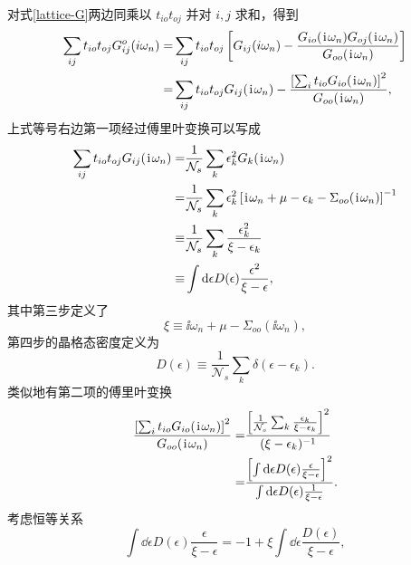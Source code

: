 对式\eqref{lattice-G}两边同乘以 $t_{io}t_{oj}$ 并对 $i,j$ 求和，得到
\begin{equation}
    \begin{aligned}
        \sum_{ij}t_{io}t_{oj}G_{ij}^o(i\omega_n)=&\sum_{ij}t_{io}t_{oj}\left[ G_{ij}(i\omega_n)-\frac{G_{io}(\hspace{0.1em}\mathrm{i}\hspace{0.1em}\omega_n)G_{oj}(\hspace{0.1em}\mathrm{i}\hspace{0.1em}\omega_n)}{G_{oo}(\hspace{0.1em}\mathrm{i}\hspace{0.1em}\omega_n)} \right]\\
        =& \sum_{ij}t_{io}t_{oj}G_{ij}(\hspace{0.1em}\mathrm{i}\hspace{0.1em}\omega_n)-\frac{\left[ \sum_i t_{io}G_{io}(\hspace{0.1em}\mathrm{i}\hspace{0.1em}\omega_n) \right]^2}{G_{oo}(\hspace{0.1em}\mathrm{i}\hspace{0.1em}\omega_n)},
    \end{aligned}
\end{equation}
上式等号右边第一项经过傅里叶变换可以写成 
\begin{equation}
    \begin{aligned}
        \sum_{ij}t_{io}t_{oj}G_{ij}(\hspace{0.1em}\mathrm{i}\hspace{0.1em}\omega_n)=& \frac{1}{\mathcal{N}_s}\sum_k\epsilon_k^2G_k(\hspace{0.1em}\mathrm{i}\hspace{0.1em}\omega_n)\\
        =&\frac{1}{\mathcal{N}_s}\sum_k\epsilon_k^2\left[ \hspace{0.1em}\mathrm{i}\hspace{0.1em}\omega_n +\mu-\epsilon_k-\Sigma_{oo}(\hspace{0.1em}\mathrm{i}\hspace{0.1em}\omega_n) \right]^{-1}\\
        \equiv & \frac{1}{\mathcal{N}_s}\sum_k\frac{\epsilon_k^2}{\xi -\epsilon_k}\\
        \equiv & \int\mathrm{d} \epsilon D(\epsilon)\frac{\epsilon^2}{\xi -\epsilon},
    \end{aligned}
\end{equation}
其中第三步定义了
\begin{equation}
    \xi\equiv \ii\omega_n+\mu-\Sigma_{oo}(\ii\omega_n),\label{equiv-freq}
\end{equation}
第四步的晶格态密度定义为 
\begin{equation}
    D(\epsilon)\equiv \frac{1}{\mathcal{N}_s}\sum_{k}\delta(\epsilon-\epsilon_k).
\end{equation}
类似地有第二项的傅里叶变换
\begin{equation}
    \begin{aligned}
        \frac{\left[ \sum_i t_{io}G_{io}(\hspace{0.1em}\mathrm{i}\hspace{0.1em}\omega_n) \right]^2}{G_{oo}(\hspace{0.1em}\mathrm{i}\hspace{0.1em}\omega_n)}=&\frac{\left[ \frac{1}{\mathcal{N}_s}\sum_k\frac{\epsilon_k}{\xi-\epsilon_k} \right]^2}{(\xi-\epsilon_k)^{-1}}\\
        =& \frac{\left[ \int\mathrm{d}\epsilon D(\epsilon)\frac{\epsilon}{\xi-\epsilon} \right]^2}{\int\mathrm{d}\epsilon D(\epsilon)\frac{1}{\xi-\epsilon}}.
    \end{aligned}
\end{equation}
考虑恒等关系 
\begin{equation}
    \int\dd\epsilon D(\epsilon)\frac{\epsilon}{\xi-\epsilon}=-1+\xi\int\dd\epsilon\frac{D(\epsilon)}{\xi-\epsilon},\label{equiv1}
\end{equation}
